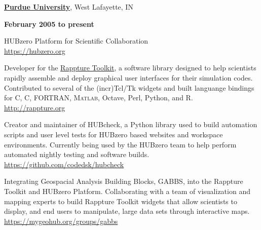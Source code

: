 \documentclass[10pt]{article}
\renewcommand\textit[1]{\underline{\smash{#1}}}
\providecommand\Matlab{\textsc{Matlab}}
\newcommand\CC{C\nolinebreak[4]\hspace{-.05em}\raisebox{.4ex}{\relsize{-3}{\textbf{++}}}}
\begin{document}
\href{http://www.purdue.edu/}{\textbf{Purdue University}},
West Lafayette, IN
\begin{outerlist}

    \item[] \textit{Software Engineer}%
            \hfill \textbf{February 2005 to present}
    \item[] HUBzero\textsuperscript{\textregistered} Platform for Scientific Collaboration \\
        \url{https://hubzero.org}

        \begin{innerlist}

            \item Developer for the
                \href{http://rappture.org}{Rappture Toolkit}, a software
                library designed to help scientists rapidly assemble and
                deploy graphical user interfaces for their simulation codes.
                Contributed to several of the (incr)Tcl/Tk widgets and built
                languange bindings for C, \CC, FORTRAN, \Matlab, Octave,
                Perl, Python, and R. \\
                \url{http://rappture.org}

            \item Creator and maintainer of HUBcheck,
                a Python library used to build automation scripts
                and user level tests for HUBzero based websites and
                workspace environments. Currently being used by the HUBzero
                team to help perform automated nightly testing and
                software builds. \\
                \url{https://github.com/codedsk/hubcheck}

            \item Integrating Geospacial Analysis Building Blocks, GABBS,
                into the Rappture Toolkit and HUBzero Platform. Collaborating
                with a team of visualization and mapping experts
                to build Rappture Toolkit widgets that allow scientists to
                display, and end users to manipulate, large data sets through
                interactive maps. \\
                \url{https://mygeohub.org/groups/gabbs}


\end{innerlist}
\end{outerlist}
\end{document}
